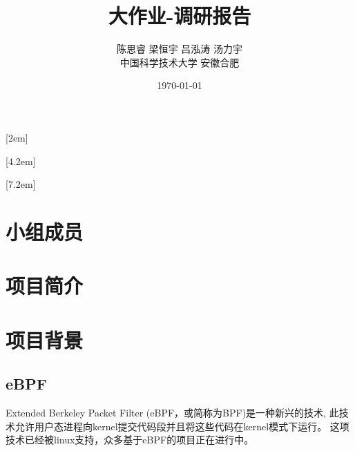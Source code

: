 \documentclass[AutoFakeBold,a4paper]{ctexart}
\begin{document}
\title{\textbf{\Huge 大作业-调研报告}}

\author{陈思睿 \quad 梁恒宇 \quad 吕泓涛 \quad 汤力宇\\
中国科学技术大学 \quad 安徽合肥}

\date{\today}

\maketitle


[2em]{\addvspace{1.3mm}\bf}{%
\contentslabel{2.0em}}{}{\titlerule*[5pt]{$\cdot$}\contentspage}

[4.2em]{}{\contentslabel{2.5em}}{}{%
\titlerule*[5pt]{$\cdot$}\contentspage}

[7.2em]{}{\contentslabel{3.3em}}{}{%
\titlerule*[5pt]{$\cdot$}\contentspage}


    

\tableofcontents

\setcounter{page}{1}

\section{小组成员}

\section{项目简介}

\section{项目背景}


\subsection{eBPF}
    Extended Berkeley Packet Filter (eBPF，或简称为BPF)是一种新兴的技术,
    此技术允许用户态进程向kernel提交代码段并且将这些代码在kernel模式下运行。
    这项技术已经被linux支持，众多基于eBPF的项目正在进行中。
\end{document}
